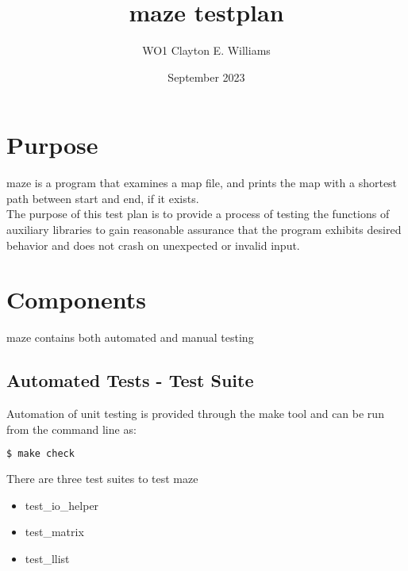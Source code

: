 \documentclass{article}
\title{maze testplan}
\author{WO1 Clayton E. Williams}
\date{September 2023}
\begin{document}
\maketitle
\section{Purpose}
maze is a program that examines a map file, and prints the map with a shortest
path between start and end, if it exists.\\
The purpose of this test plan is to provide a process of testing the functions of
auxiliary libraries to gain reasonable assurance that the program exhibits desired
behavior and does not crash on unexpected or invalid input.

\section{Components}
maze contains both automated and manual testing
    \subsection{Automated Tests - Test Suite}
    Automation of unit testing is provided through the make tool and can be run from the command line as:
    \begin{lstlisting}[language=bash]
    $ make check    
    \end{lstlisting}
    There are three test suites to test maze

    \begin{itemize}
        \item test\_io\_helper
        \item test\_matrix
        \item test\_llist
    \end{itemize}
\end{document}
